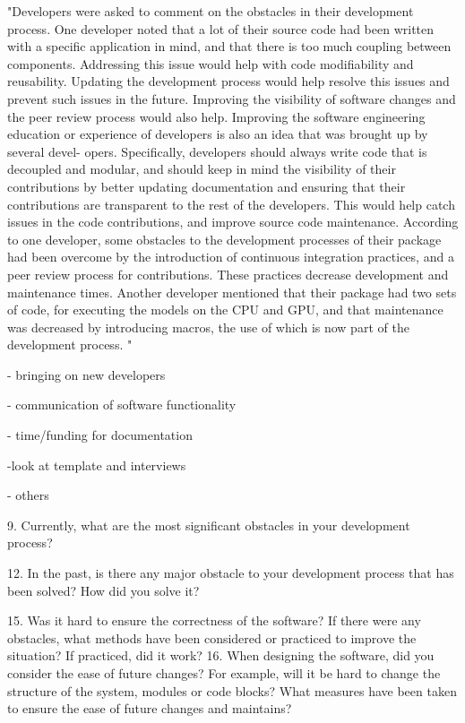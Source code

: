 \documentclass[12pt, notitlepage]{article}
\begin{document}
"Developers were asked to comment on the obstacles in their development process. One
developer noted that a lot of their source code had been written with a specific application in
mind, and that there is too much coupling between components. Addressing this issue would
help with code modifiability and reusability. Updating the development process would help
resolve this issues and prevent such issues in the future. Improving the visibility of software
changes and the peer review process would also help. Improving the software engineering
education or experience of developers is also an idea that was brought up by several devel-
opers. Specifically, developers should always write code that is decoupled and modular, and
should keep in mind the visibility of their contributions by better updating documentation
and ensuring that their contributions are transparent to the rest of the developers. This
would help catch issues in the code contributions, and improve source code maintenance.
According to one developer, some obstacles to the development processes of their package
had been overcome by the introduction of continuous integration practices, and a peer review
process for contributions. These practices decrease development and maintenance times.
Another developer mentioned that their package had two sets of code, for executing the
models on the CPU and GPU, and that maintenance was decreased by introducing macros,
the use of which is now part of the development process.
"

- bringing on new developers

- communication of software functionality

- time/funding for documentation 

-look at template and interviews

- others

9. Currently, what are the most significant obstacles in your development process?

12. In the past, is there any major obstacle to your development process that has been
solved? How did you solve it?

15. Was it hard to ensure the correctness of the software? If there were any obstacles, what
methods have been considered or practiced to improve the situation? If practiced, did
it work?
16. When designing the software, did you consider the ease of future changes? For example,
will it be hard to change the structure of the system, modules or code blocks? What
measures have been taken to ensure the ease of future changes and maintains?
\end{document}
